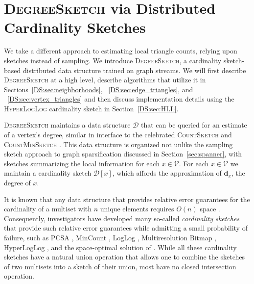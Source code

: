 \documentclass{report}
\newcommand{\algoname}[1]{\textnormal{\textsc{#1}}}
\begin{document}

\section{\algoname{DegreeSketch} via Distributed Cardinality Sketches}
 \label{DS:sec:DS}

We take a different approach to estimating local triangle counts, relying upon sketches instead of sampling.
We introduce \algoname{DegreeSketch}, a cardinality sketch-based distributed data structure trained on graph streams.
We will first describe \algoname{DegreeSketch} at a high level, describe algorithms that utilize it in Sections~\ref{DS:sec:neighborhoods}, ~\ref{DS:sec:edge_triangles}, and ~\ref{DS:sec:vertex_triangles} and then discuss implementation details using the \algoname{HyperLogLog} cardinality sketch in Section~\ref{DS:sec:HLL}.

\algoname{DegreeSketch} maintains a data structure $\mathcal{D}$ that can be queried for an estimate of a vertex's degree, similar in interface to the celebrated \algoname{CountSketch} \cite{charikar2002finding} and \algoname{CountMinSketch} \cite{cormode2005improved}.
This data structure is organized not unlike the sampling sketch approach to graph sparsification discussed in Section~\ref{sec:spanner}, with sketches summarizing the local information for each $x \in \mathcal{V}$.
For each $x \in \mathcal{V}$ we maintain a cardinality sketch $\mathcal{D}[x]$, which affords the approximation of $\mathbf{d}_x$, the degree of $x$. 

It is known that any data structure that provides relative error guarantees for the cardinality of a multiset with $n$ unique elements requires $O(n)$ space \cite{alon1999space}.
Consequently, investigators have developed many so-called \emph{cardinality sketches} that provide such relative error guarantees while admitting a small probability of failure, such as PCSA \cite{flajolet1985probabilistic}, MinCount \cite{bar2002counting},  LogLog \cite{durand2003loglog}, Multiresolution Bitmap \cite{estan2003bitmap}, HyperLogLog \cite{flajolet2007hyperloglog}, and the space-optimal solution of \cite{kane2010optimal}.
While all these cardinality sketches have a natural union operation that allows one to combine the sketches of two multisets into a sketch of their union, most have no closed intersection operation.
\end{document}
